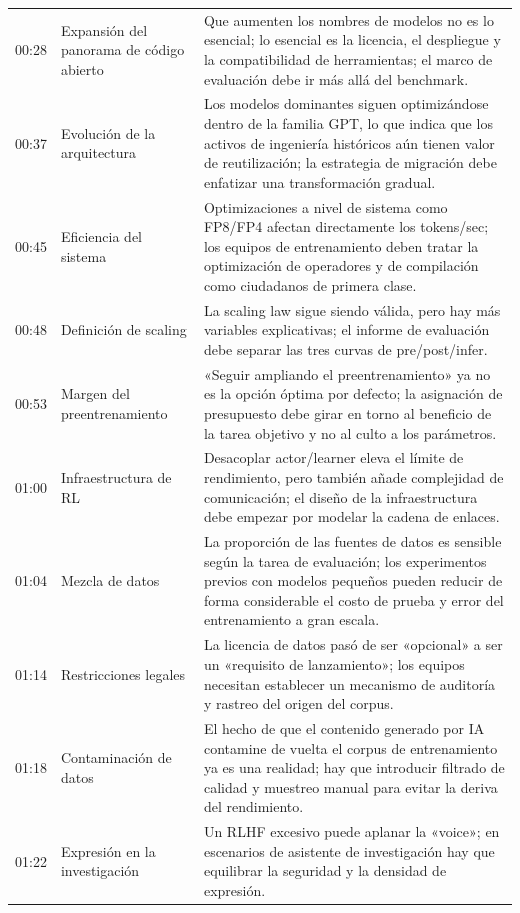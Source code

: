\begin{longtable}{p{}p{}p{}}
00:28 & Expansión del panorama de código abierto & Que aumenten los nombres de modelos no es lo esencial; lo esencial es la licencia, el despliegue y la compatibilidad de herramientas; el marco de evaluación debe ir más allá del benchmark. \\
00:37 & Evolución de la arquitectura & Los modelos dominantes siguen optimizándose dentro de la familia GPT, lo que indica que los activos de ingeniería históricos aún tienen valor de reutilización; la estrategia de migración debe enfatizar una transformación gradual. \\
00:45 & Eficiencia del sistema & Optimizaciones a nivel de sistema como FP8/FP4 afectan directamente los tokens/sec; los equipos de entrenamiento deben tratar la optimización de operadores y de compilación como ciudadanos de primera clase. \\
00:48 & Definición de scaling & La scaling law sigue siendo válida, pero hay más variables explicativas; el informe de evaluación debe separar las tres curvas de pre/post/infer. \\
00:53 & Margen del preentrenamiento & «Seguir ampliando el preentrenamiento» ya no es la opción óptima por defecto; la asignación de presupuesto debe girar en torno al beneficio de la tarea objetivo y no al culto a los parámetros. \\
01:00 & Infraestructura de RL & Desacoplar actor/learner eleva el límite de rendimiento, pero también añade complejidad de comunicación; el diseño de la infraestructura debe empezar por modelar la cadena de enlaces. \\
01:04 & Mezcla de datos & La proporción de las fuentes de datos es sensible según la tarea de evaluación; los experimentos previos con modelos pequeños pueden reducir de forma considerable el costo de prueba y error del entrenamiento a gran escala. \\
01:14 & Restricciones legales & La licencia de datos pasó de ser «opcional» a ser un «requisito de lanzamiento»; los equipos necesitan establecer un mecanismo de auditoría y rastreo del origen del corpus. \\
01:18 & Contaminación de datos & El hecho de que el contenido generado por IA contamine de vuelta el corpus de entrenamiento ya es una realidad; hay que introducir filtrado de calidad y muestreo manual para evitar la deriva del rendimiento. \\
01:22 & Expresión en la investigación & Un RLHF excesivo puede aplanar la «voice»; en escenarios de asistente de investigación hay que equilibrar la seguridad y la densidad de expresión. \\

\end{longtable}
